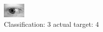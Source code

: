 \begin{figure}[h!]
\begin{center}
\includegraphics[width=0.60\columnwidth]{figures/ID698_class_3_target_4.png}
\end{center}
\caption{ Classification: 3 actual target: 4}
\label{fig:ID698_class_3_target_4}
\end{figure}
